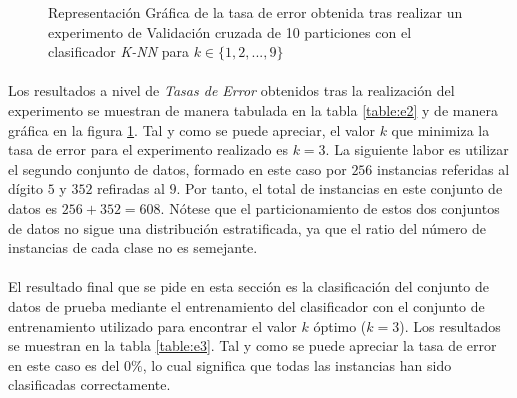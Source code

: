 \documentclass{article}
\begin{document}
		\begin{figure}
			\begin{center}
			\end{center}
			\caption{Representación Gráfica de la tasa de error obtenida tras realizar un experimento de Validación cruzada de 10 particiones con el clasificador \emph{K-NN} para $k \in \{1,2,...,9\}$}
			\label{plot:e2}
		\end{figure}

		\paragraph{}
		Los resultados a nivel de \emph{Tasas de Error} obtenidos tras la realización del experimento se muestran de manera tabulada en la tabla \ref{table:e2} y de manera gráfica en la figura \ref{plot:e2}. Tal y como se puede apreciar, el valor $k$ que minimiza la tasa de error para el experimento realizado es $k = 3$. La siguiente labor es utilizar el segundo conjunto de datos, formado en este caso por $256$ instancias referidas al dígito $5$ y $352$ refiradas al $9$. Por tanto, el total de instancias en este conjunto de datos es $256 + 352 = 608$. Nótese que el particionamiento de estos dos conjuntos de datos no sigue una distribución estratificada, ya que el ratio del número de instancias de cada clase no es semejante.


		\paragraph{}
		El resultado final que se pide en esta sección es la clasificación del conjunto de datos de prueba mediante el entrenamiento del clasificador con el conjunto de entrenamiento utilizado para encontrar el valor $k$ óptimo ($k =3$). Los resultados se muestran en la tabla \ref{table:e3}. Tal y como se puede apreciar la tasa de error en este caso es del $0\%$, lo cual significa que todas las instancias han sido clasificadas correctamente.
\end{document}
